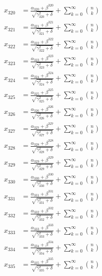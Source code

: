 \documentclass{article}
\begin{document}
\begin{align}
  x_{320} &= \frac{\alpha_{320} + \beta^{320}}{\sqrt{\gamma_{320}^2 + \delta}} + \sum_{k=0}^{\infty} \binom{n}{k} \label{eq:320} \\
  x_{321} &= \frac{\alpha_{321} + \beta^{321}}{\sqrt{\gamma_{321}^2 + \delta}} + \sum_{k=0}^{\infty} \binom{n}{k} \label{eq:321} \\
  x_{322} &= \frac{\alpha_{322} + \beta^{322}}{\sqrt{\gamma_{322}^2 + \delta}} + \sum_{k=0}^{\infty} \binom{n}{k} \label{eq:322} \\
  x_{323} &= \frac{\alpha_{323} + \beta^{323}}{\sqrt{\gamma_{323}^2 + \delta}} + \sum_{k=0}^{\infty} \binom{n}{k} \label{eq:323} \\
  x_{324} &= \frac{\alpha_{324} + \beta^{324}}{\sqrt{\gamma_{324}^2 + \delta}} + \sum_{k=0}^{\infty} \binom{n}{k} \label{eq:324} \\
  x_{325} &= \frac{\alpha_{325} + \beta^{325}}{\sqrt{\gamma_{325}^2 + \delta}} + \sum_{k=0}^{\infty} \binom{n}{k} \label{eq:325} \\
  x_{326} &= \frac{\alpha_{326} + \beta^{326}}{\sqrt{\gamma_{326}^2 + \delta}} + \sum_{k=0}^{\infty} \binom{n}{k} \label{eq:326} \\
  x_{327} &= \frac{\alpha_{327} + \beta^{327}}{\sqrt{\gamma_{327}^2 + \delta}} + \sum_{k=0}^{\infty} \binom{n}{k} \label{eq:327} \\
  x_{328} &= \frac{\alpha_{328} + \beta^{328}}{\sqrt{\gamma_{328}^2 + \delta}} + \sum_{k=0}^{\infty} \binom{n}{k} \label{eq:328} \\
  x_{329} &= \frac{\alpha_{329} + \beta^{329}}{\sqrt{\gamma_{329}^2 + \delta}} + \sum_{k=0}^{\infty} \binom{n}{k} \label{eq:329} \\
  x_{330} &= \frac{\alpha_{330} + \beta^{330}}{\sqrt{\gamma_{330}^2 + \delta}} + \sum_{k=0}^{\infty} \binom{n}{k} \label{eq:330} \\
  x_{331} &= \frac{\alpha_{331} + \beta^{331}}{\sqrt{\gamma_{331}^2 + \delta}} + \sum_{k=0}^{\infty} \binom{n}{k} \label{eq:331} \\
  x_{332} &= \frac{\alpha_{332} + \beta^{332}}{\sqrt{\gamma_{332}^2 + \delta}} + \sum_{k=0}^{\infty} \binom{n}{k} \label{eq:332} \\
  x_{333} &= \frac{\alpha_{333} + \beta^{333}}{\sqrt{\gamma_{333}^2 + \delta}} + \sum_{k=0}^{\infty} \binom{n}{k} \label{eq:333} \\
  x_{334} &= \frac{\alpha_{334} + \beta^{334}}{\sqrt{\gamma_{334}^2 + \delta}} + \sum_{k=0}^{\infty} \binom{n}{k} \label{eq:334} \\
  x_{335} &= \frac{\alpha_{335} + \beta^{335}}{\sqrt{\gamma_{335}^2 + \delta}} + \sum_{k=0}^{\infty} \binom{n}{k} \label{eq:335} \\

\end{align}
\end{document}
